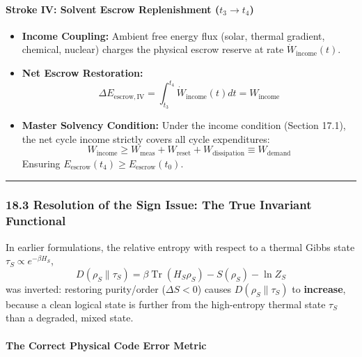 \documentclass[
]{article}
\providecommand{\tightlist}{%
  \setlength{\itemsep}{0pt}\setlength{\parskip}{0pt}}
\begin{document}
\paragraph{\texorpdfstring{Stroke IV: Solvent Escrow Replenishment
(\(t_3 \to t_4\))}{Stroke IV: Solvent Escrow Replenishment (t\_3 \textbackslash to t\_4)}}\label{stroke-iv-solvent-escrow-replenishment-t_3-to-t_4}

\begin{itemize}
\tightlist
\item
  \textbf{Income Coupling:} Ambient free energy flux (solar, thermal
  gradient, chemical, nuclear) charges the physical escrow reserve at
  rate \(\dot W_{\mathrm{income}}(t)\).
\item
  \textbf{Net Escrow Restoration:}
  \[\Delta E_{\mathrm{escrow,IV}} = \int_{t_3}^{t_4} \dot W_{\mathrm{income}}(t) dt = W_{\mathrm{income}}\]
\item
  \textbf{Master Solvency Condition:} Under the income condition
  (Section 17.1), the net cycle income strictly covers all cycle
  expenditures:
  \[W_{\mathrm{income}} \ge W_{\mathrm{meas}} + W_{\mathrm{reset}} + W_{\mathrm{dissipation}} \equiv W_{\mathrm{demand}}\]
  Ensuring \(E_{\mathrm{escrow}}(t_4) \ge E_{\mathrm{escrow}}(t_0)\).
\end{itemize}

\begin{center}\rule{0.5\linewidth}{0.5pt}\end{center}

\subsubsection{18.3 Resolution of the Sign Issue: The True Invariant
Functional}\label{resolution-of-the-sign-issue-the-true-invariant-functional}

In earlier formulations, the relative entropy with respect to a thermal
Gibbs state \(\tau_S \propto e^{-\beta H_S}\),
\[D(\rho_S \| \tau_S) = \beta \operatorname{Tr}(H_S \rho_S) - S(\rho_S) - \ln Z_S\]
was inverted: restoring purity/order (\(\Delta S < 0\)) causes
\(D(\rho_S \| \tau_S)\) to \textbf{increase}, because a clean logical
state is further from the high-entropy thermal state \(\tau_S\) than a
degraded, mixed state.

\paragraph{The Correct Physical Code Error
Metric}\label{the-correct-physical-code-error-metric}
\end{document}
